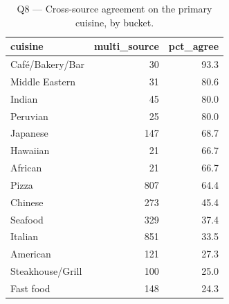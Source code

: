 \begin{table}[ht]
\centering
\caption{Q8 — Cross-source agreement on the primary cuisine, by bucket.}
\label{tab:q8_cuisine_agreement}
{\tiny
\begin{tabular}{lrr}
\toprule
cuisine & multi\_source & pct\_agree \\
\midrule
Café/Bakery/Bar & 30 & 93.3 \\
Middle Eastern & 31 & 80.6 \\
Indian & 45 & 80.0 \\
Peruvian & 25 & 80.0 \\
Japanese & 147 & 68.7 \\
Hawaiian & 21 & 66.7 \\
African & 21 & 66.7 \\
Pizza & 807 & 64.4 \\
Chinese & 273 & 45.4 \\
Seafood & 329 & 37.4 \\
Italian & 851 & 33.5 \\
American & 121 & 27.3 \\
Steakhouse/Grill & 100 & 25.0 \\
Fast food & 148 & 24.3 \\
\bottomrule
\end{tabular}
}
\end{table}
